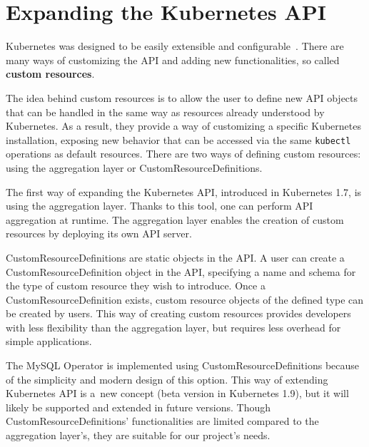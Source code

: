 \section{Expanding the Kubernetes API}
Kubernetes was designed to be easily extensible and configurable~\cite{extending-kubeapi}. There are
many ways of customizing the API and adding new functionalities, so called \textbf{custom resources}.

The idea behind custom resources is to allow the user to define new API objects that can be handled
in the same way as resources already understood by Kubernetes. As a result, they provide a way of
customizing a specific Kubernetes installation, exposing new behavior that can be accessed via the
same \texttt{kubectl} operations as default resources. There are two ways of defining custom resources: using
the aggregation layer or CustomResourceDefinitions.

The first way of expanding the Kubernetes API, introduced in Kubernetes 1.7, is using the
aggregation layer. Thanks to this tool, one can perform API aggregation at runtime. The aggregation
layer enables the creation of custom resources by deploying its own API server.

CustomResourceDefinitions are static objects in the API. A user can create a
CustomResourceDefinition object in the API, specifying a name and schema for the type of custom
resource they wish to introduce. Once a CustomResourceDefinition exists, custom resource objects of the defined type can
be created by users. This way of creating custom resources provides developers with less flexibility
than the aggregation layer, but requires less overhead for simple applications.

The MySQL Operator is implemented using CustomResourceDefinitions because of the simplicity and
modern design of this option. This way of extending Kubernetes API is a~new concept (beta version in
Kubernetes 1.9), but it will likely be supported and extended in future versions. Though
CustomResourceDefinitions' functionalities are limited compared to the aggregation layer's, they
are suitable for our project's needs.
